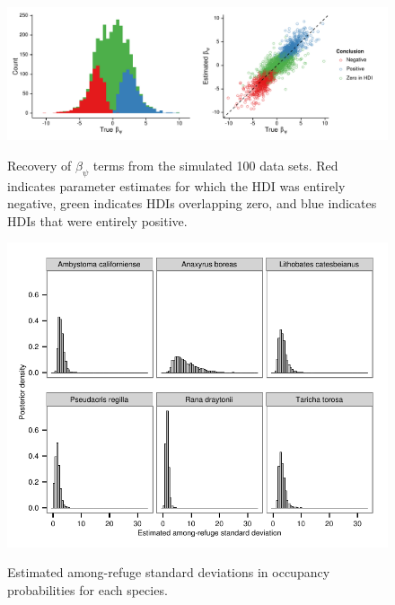 \begin{figure}[htbp]
\caption[Recovery of species-specific effects]{
Recovery of $\beta_\psi$ terms from the simulated 100 data sets. Red
indicates parameter estimates for which the HDI was entirely negative,
green indicates HDIs overlapping zero, and blue indicates HDIs that were
entirely positive.
}
\centering
\includegraphics[width=150mm]{figs/ch3/fig_s2.pdf}
\label{3-a2}
\end{figure}

\begin{figure}[htbp]
\caption[Among refuge variance parameters for occupancy probabilities]{
Estimated among-refuge standard deviations in occupancy probabilities
for each species.
}
\centering
\includegraphics[width=150mm]{figs/ch3/fig_s3.pdf}
\label{3-a3}
\end{figure}

